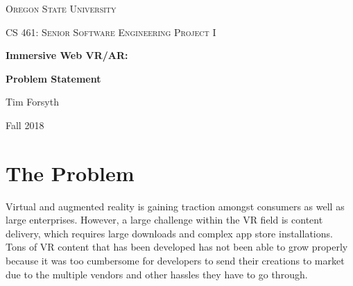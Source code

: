 \documentclass[draftclsnofoot,onecolumn,letterpaper,10pt]{article}
\begin{document}
\begin{titlepage}
    \centering
    {\scshape\LARGE Oregon State University \par}
    \vspace{1cm}
    {\scshape\Large CS 461: Senior Software Engineering Project I\par}
    \vspace{1.5cm}
    {\Large\bfseries Immersive Web VR/AR:\par}
    {\huge\bfseries Problem Statement\par}
    \vspace{2cm}
    {\Large Tim Forsyth\par}
    \vfill

    \begin{abstract}
WebVR is a new, cutting edge technology that allows users to access VR content straight from their web browsers. While virtual and augmented reality is gaining traction, there aren't any great examples of the potentials of WebVR. This is where this project comes in. The goal is to showcase and display the potential of WebVR through an immersive VR experience that can be enjoyed straight from a web browser. We want to create an interactive experience that can draw in not only consumers, but also gain interest from developers towards creating content themselves using WebVR.
    \end{abstract}

    \vfill

    {\large Fall 2018\par}
\end{titlepage}



\section{The Problem}
Virtual and augmented reality is gaining traction amongst consumers as well as large enterprises. However, a large challenge within the VR field is content delivery, which requires large downloads and complex app store installations. Tons of VR content that has been developed has not been able to grow properly because it was too cumbersome for developers to send their creations to market due to the multiple vendors and other hassles they have to go through. 
\end{document}
